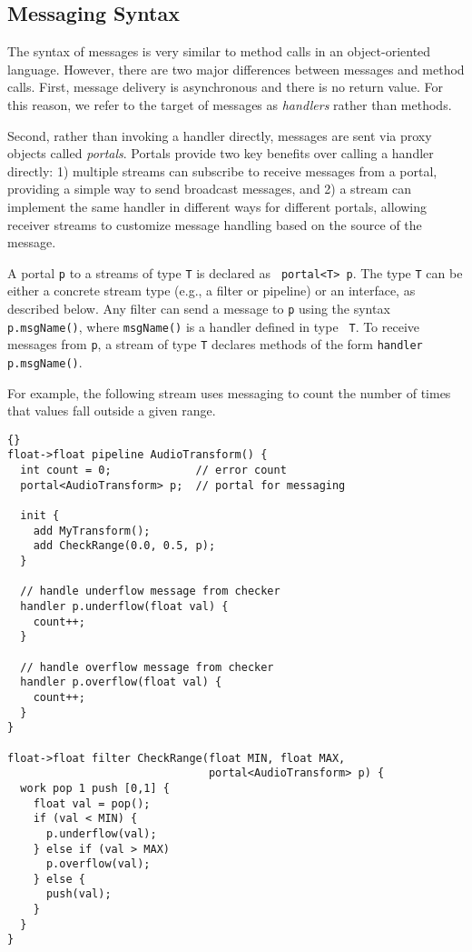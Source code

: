 \subsection{Messaging Syntax}
\label{sec:message-syntax}

The syntax of messages is very similar to method calls in an
object-oriented language.  However, there are two major differences
between messages and method calls.  First, message delivery is
asynchronous and there is no return value.  For this reason, we refer
to the target of messages as {\it handlers} rather than methods.

Second, rather than invoking a handler directly, messages are sent via
proxy objects called {\it portals}.  Portals provide two key benefits
over calling a handler directly: 1) multiple streams can subscribe to
receive messages from a portal, providing a simple way to send
broadcast messages, and 2) a stream can implement the same handler in
different ways for different portals, allowing receiver streams to
customize message handling based on the source of the message.

A portal {\tt p} to a streams of type {\tt T} is declared as {\tt
portal<T> p}.  The type {\tt T} can be either a concrete stream type
(e.g., a filter or pipeline) or an interface, as described below.  Any
filter can send a message to {\tt p} using the syntax {\tt
p.msgName()}, where {\tt msgName()} is a handler defined in type {\tt
T}.  To receive messages from {\tt p}, a stream of type {\tt T}
declares methods of the form {\tt handler p.msgName()}.

For example, the following stream uses messaging to count the number
of times that values fall outside a given range.

\begin{lstlisting}{}
float->float pipeline AudioTransform() {
  int count = 0;             // error count
  portal<AudioTransform> p;  // portal for messaging

  init {
    add MyTransform();
    add CheckRange(0.0, 0.5, p);
  }

  // handle underflow message from checker
  handler p.underflow(float val) {
    count++;
  }

  // handle overflow message from checker
  handler p.overflow(float val) {
    count++;
  }
}

float->float filter CheckRange(float MIN, float MAX,
                               portal<AudioTransform> p) {
  work pop 1 push [0,1] {
    float val = pop();
    if (val < MIN) {
      p.underflow(val);
    } else if (val > MAX)
      p.overflow(val);
    } else {
      push(val);
    }
  }
}
\end{lstlisting}

